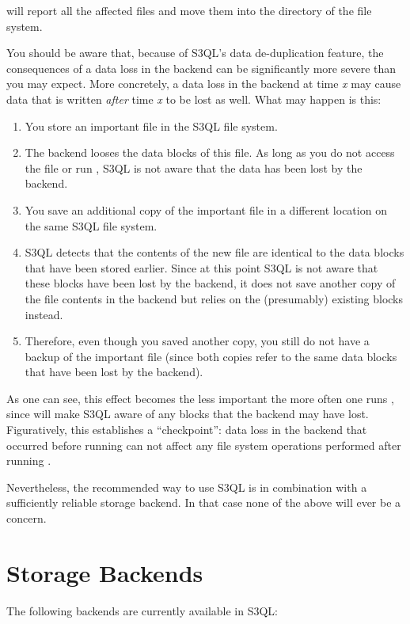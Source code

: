 \documentclass[letterpaper,10pt,english]{sphinxmanual}
\begin{document}
 will report all the affected files and move them into the
 directory of the file system.

You should be aware that, because of S3QL's data de-duplication
feature, the consequences of a data loss in the backend can be
significantly more severe than you may expect. More concretely, a data
loss in the backend at time \emph{x} may cause data that is written \emph{after}
time \emph{x} to be lost as well. What may happen is this:
\begin{enumerate}
\item {} 
You store an important file in the S3QL file system.

\item {} 
The backend looses the data blocks of this file. As long as you
do not access the file or run , S3QL
is not aware that the data has been lost by the backend.

\item {} 
You save an additional copy of the important file in a different
location on the same S3QL file system.

\item {} 
S3QL detects that the contents of the new file are identical to the
data blocks that have been stored earlier. Since at this point S3QL
is not aware that these blocks have been lost by the backend, it
does not save another copy of the file contents in the backend but
relies on the (presumably) existing blocks instead.

\item {} 
Therefore, even though you saved another copy, you still do not
have a backup of the important file (since both copies refer to the
same data blocks that have been lost by the backend).

\end{enumerate}

As one can see, this effect becomes the less important the more often
one runs , since  will make S3QL aware of any
blocks that the backend may have lost. Figuratively, this establishes
a ``checkpoint'': data loss in the backend that occurred before running
 can not affect any file system operations performed after
running .

Nevertheless, the recommended way to use S3QL is in combination with a
sufficiently reliable storage backend. In that case none of the above
will ever be a concern.


\chapter{Storage Backends}
\label{backends:id1}\label{backends::doc}\label{backends:storage-backends}
The following backends are currently available in S3QL:
\end{document}
